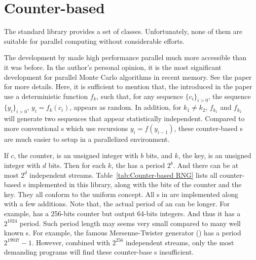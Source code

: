 \section{Counter-based \protect\rng}
\label{sec:Counter-based RNG}

The standard library provides a set of \rng classes. Unfortunately, none of
them are suitable for parallel computing without considerable efforts.

The development by \textcite{Salmon:2011um} made high performance parallel \rng
much more accessible than it was before. In the author's personal opinion, it
is the most significant development for parallel Monte Carlo algorithms in
recent memory. See the paper for more details. Here, it is sufficient to
mention that, the \rng introduced in the paper use a deterministic function
$f_k$, such that, for any sequence $\{c_i\}_{i>0}$, the sequence
$\{y_i\}_{i>0}$, $y_i = f_k(c_i)$, appears as random. In addition, for $k_1 \ne
k_2$, $f_{k_1}$ and $f_{k_2}$ will generate two sequences that appear
statistically independent. Compared to more conventional \rng{}s which use
recursions $y_i = f(y_{i - 1})$, these counter-based \rng{}s are much easier to
setup in a parallelized environment.

If $c$, the counter, is an unsigned integer with $b$ bits, and $k$, the key, is
an unsigned integer with $d$ bits. Then for each $k$, the \rng has a period
$2^b$. And there can be at most $2^d$ independent streams.
Table~\ref{tab:Counter-based RNG} lists all counter-based \rng{}s implemented
in this library, along with the bits of the counter and the key. They all
conform to the \cppoo uniform \rng concept. All \rng{}s in
\textcite{Salmon:2011um} are implemented along with a few additions. Note that,
the actual period of an \rng can be longer. For example, 
has a 256-bits counter but output 64-bits integers. And thus it has a
$2^{1024}$ period. Such period length may seems very small compared to many
well known \rng{}s. For example, the famous Mersenne-Twister generator
() has a period $2^{19937} - 1$. However, combined with
$2^{256}$ independent streams, only the most demanding programs will find these
counter-base \rng{}s insufficient.

